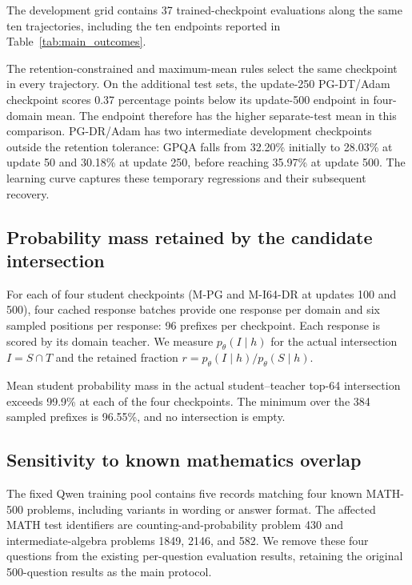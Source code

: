 The development grid contains 37 trained-checkpoint evaluations along the same ten trajectories, including the ten endpoints reported in Table~\ref{tab:main_outcomes}.

The retention-constrained and maximum-mean rules select the same checkpoint in every trajectory. On the additional test sets, the update-250 PG-DT/Adam checkpoint scores 0.37 percentage points below its update-500 endpoint in four-domain mean. The endpoint therefore has the higher separate-test mean in this comparison. PG-DR/Adam has two intermediate development checkpoints outside the retention tolerance: GPQA falls from 32.20\% initially to 28.03\% at update 50 and 30.18\% at update 250, before reaching 35.97\% at update 500. The learning curve captures these temporary regressions and their subsequent recovery.

\subsection{Probability mass retained by the candidate intersection}
\label{app:actual_intersection_coverage}

For each of four student checkpoints (M-PG and M-I64-DR at updates 100 and 500), four cached response batches provide one response per domain and six sampled positions per response: 96 prefixes per checkpoint. Each response is scored by its domain teacher. We measure $p_\theta(I\mid h)$ for the actual intersection $I=S\cap T$ and the retained fraction $r=p_\theta(I\mid h)/p_\theta(S\mid h)$.

Mean student probability mass in the actual student--teacher top-64 intersection exceeds 99.9\% at each of the four checkpoints. The minimum over the 384 sampled prefixes is 96.55\%, and no intersection is empty.

\subsection{Sensitivity to known mathematics overlap}
\label{app:math_overlap_sensitivity}

The fixed Qwen training pool contains five records matching four known MATH-500 problems, including variants in wording or answer format. The affected MATH test identifiers are counting-and-probability problem 430 and intermediate-algebra problems 1849, 2146, and 582. We remove these four questions from the existing per-question evaluation results, retaining the original 500-question results as the main protocol.

